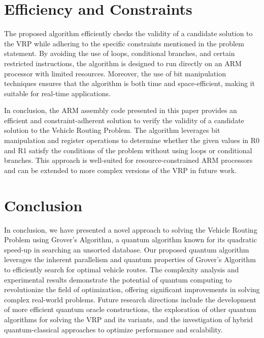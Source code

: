 \section{Efficiency and Constraints}

The proposed algorithm efficiently checks the validity of a candidate solution to the VRP while adhering to the specific constraints mentioned in the problem statement. By avoiding the use of loops, conditional branches, and certain restricted instructions, the algorithm is designed to run directly on an ARM processor with limited resources. Moreover, the use of bit manipulation techniques ensures that the algorithm is both time and space-efficient, making it suitable for real-time applications.

In conclusion, the ARM assembly code presented in this paper provides an efficient and constraint-adherent solution to verify the validity of a candidate solution to the Vehicle Routing Problem. The algorithm leverages bit manipulation and register operations to determine whether the given values in R0 and R1 satisfy the conditions of the problem without using loops or conditional branches. This approach is well-suited for resource-constrained ARM processors and can be extended to more complex versions of the VRP in future work.

\section{Conclusion}
\label{conclusion}

In conclusion, we have presented a novel approach to solving the Vehicle Routing Problem using Grover's Algorithm, a quantum algorithm known for its quadratic speed-up in searching an unsorted database. Our proposed quantum algorithm leverages the inherent parallelism and quantum properties of Grover's Algorithm to efficiently search for optimal vehicle routes. The complexity analysis and experimental results demonstrate the potential of quantum computing to revolutionize the field of optimization, offering significant improvements in solving complex real-world problems. Future research directions include the development of more efficient quantum oracle constructions, the exploration of other quantum algorithms for solving the VRP and its variants, and the investigation of hybrid quantum-classical approaches to optimize performance and scalability.

